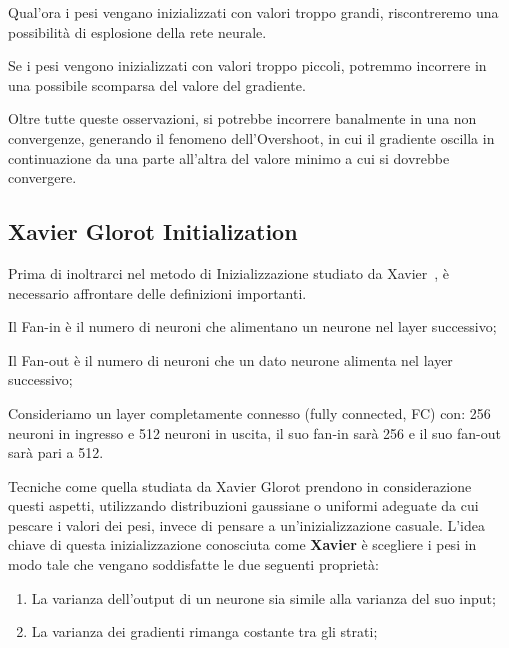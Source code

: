 \begin{Osservazione}
    Qual'ora i pesi vengano inizializzati con valori troppo grandi, riscontreremo una possibilità di esplosione della rete neurale.
\end{Osservazione}

\begin{Osservazione}
    Se i pesi vengono inizializzati con valori troppo piccoli, potremmo incorrere in una possibile scomparsa del valore del gradiente.
\end{Osservazione}

Oltre tutte queste osservazioni, si potrebbe incorrere banalmente in una non convergenze, generando il fenomeno dell'Overshoot, in cui il gradiente oscilla in continuazione da una parte all'altra del valore minimo a cui si dovrebbe convergere.

\subsection{Xavier Glorot Initialization}
Prima di inoltrarci nel metodo di Inizializzazione studiato da Xavier~\cite{glorot2010understanding}, è necessario affrontare delle definizioni importanti.

\begin{Definizione}[Fan-in]
    Il Fan-in è il numero di neuroni che alimentano un neurone nel layer successivo;
\end{Definizione}

\begin{Definizione}
    Il Fan-out è il numero di neuroni che un dato neurone alimenta nel layer successivo;
\end{Definizione}

\begin{Esempio}
    Consideriamo un layer completamente connesso (fully connected, FC) con: 256 neuroni in ingresso e 512 neuroni in uscita, il suo fan-in sarà 256 e il suo fan-out sarà pari a 512.
\end{Esempio}

Tecniche come quella studiata da Xavier Glorot prendono in considerazione questi aspetti, utilizzando distribuzioni gaussiane o uniformi adeguate da cui pescare i valori dei pesi, invece di pensare a un'inizializzazione casuale. L’idea chiave di questa inizializzazione conosciuta come \textbf{Xavier} è scegliere i pesi in modo tale che vengano soddisfatte le due seguenti proprietà:
\begin{enumerate}
    \item La varianza dell'output di un neurone sia simile alla varianza del suo input;
    \item La varianza dei gradienti rimanga costante tra gli strati;
\end{enumerate}

